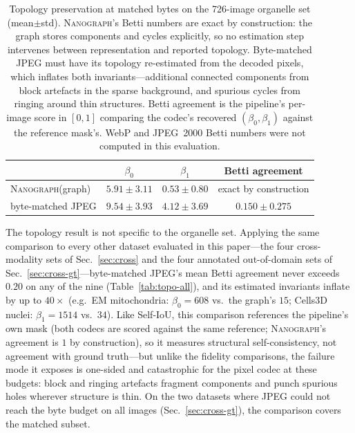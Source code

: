 \documentclass[10pt,a4paper]{article}
\newcommand{\method}{\textnormal{\textsc{Nanograph}}\xspace}
\begin{document}
\begin{table}[t]
\centering
\caption{Topology preservation at matched bytes on the 726-image organelle
set (mean$\pm$std). \method's Betti numbers are exact by construction: the
graph stores components and cycles explicitly, so no estimation step
intervenes between representation and reported topology. Byte-matched JPEG
must have its topology re-estimated from the decoded pixels, which inflates
both invariants---additional connected components from block artefacts in the
sparse background, and spurious cycles from ringing around thin structures.
Betti agreement is the pipeline's per-image score in $[0,1]$ comparing the
codec's recovered $(\beta_0,\beta_1)$ against the reference mask's. WebP and
JPEG~2000 Betti numbers were not computed in this evaluation.}
\label{tab:topo}
\begin{tabular}{lccc}
\toprule
 & $\beta_0$ & $\beta_1$ & Betti agreement\\
\midrule
\method (graph)        & $5.91\pm3.11$ & $0.53\pm0.80$ & exact by construction\\
byte-matched JPEG      & $9.54\pm3.93$ & $4.12\pm3.69$ & $0.150\pm0.275$\\
\bottomrule
\end{tabular}
\end{table}

The topology result is not specific to the organelle set. Applying the same
comparison to every other dataset evaluated in this paper---the four
cross-modality sets of Sec.~\ref{sec:cross} and the four annotated
out-of-domain sets of Sec.~\ref{sec:cross-gt}---byte-matched JPEG's mean
Betti agreement never exceeds $0.20$ on any of the nine
(Table~\ref{tab:topo-all}), and its estimated invariants inflate by up to
$40\times$ (e.g.\ EM mitochondria: $\beta_0=608$ vs.\ the graph's $15$;
Cells3D nuclei: $\beta_1=1514$ vs.\ $34$). Like Self-IoU, this comparison
references the pipeline's own mask (both codecs are scored against the same
reference; \method's agreement is $1$ by construction), so it measures
structural self-consistency, not agreement with ground truth---but unlike
the fidelity comparisons, the failure mode it exposes is one-sided and
catastrophic for the pixel codec at these budgets: block and ringing
artefacts fragment components and punch spurious holes wherever structure is
thin. On the two datasets where JPEG could not reach the byte budget on all
images (Sec.~\ref{sec:cross-gt}), the comparison covers the matched subset.
\end{document}
